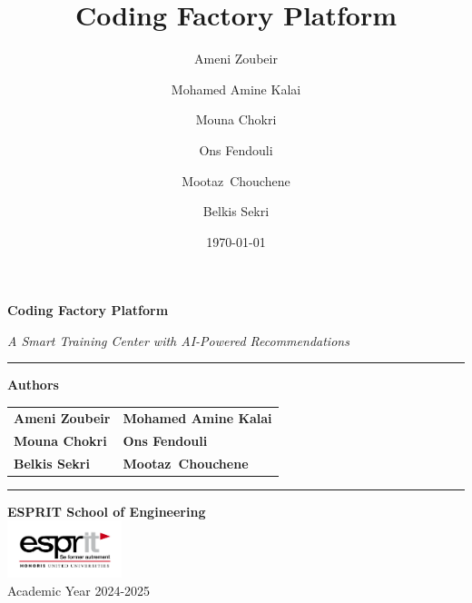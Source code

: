 \documentclass[12pt,a4paper]{report}
\title{Coding Factory Platform}
\author{Ameni Zoubeir \and Mohamed Amine Kalai \and Mouna Chokri \and Ons Fendouli \and {\mbox{Mootaz Chouchene}} \and Belkis Sekri}
\date{\today}
\begin{document}
\begin{titlepage}
\thispagestyle{empty} %

\begin{center}
\vspace*{2cm} %

{\color{black}\fontsize{28}{34}\selectfont\bfseries Coding Factory Platform}

\vspace{0.8cm}
{\large\itshape A Smart Training Center with AI-Powered Recommendations}

\vspace{2cm}

\rule{0.7\textwidth}{1pt}

\vspace{2cm}

{\large\bfseries Authors}\\[0.3cm]
\begin{tabular}{p{3.5cm}p{3.5cm}}
\textbf{Ameni Zoubeir} & \textbf{Mohamed Amine Kalai} \\[0.2cm]
\textbf{Mouna Chokri} & \textbf{Ons Fendouli} \\[0.2cm]
\textbf{Belkis Sekri} & \textbf{\mbox{Mootaz Chouchene}}
\end{tabular}

\vspace{2cm}

\rule{0.5\textwidth}{1pt}

\vfill

{\large\bfseries ESPRIT School of Engineering}\\[0.5cm]
\includegraphics[width=0.25\textwidth]{media/esprit.png}\\[0.5cm]
{\normalsize Academic Year 2024-2025}\\[0.5cm]

\end{center}
\end{titlepage}

\newpage
\thispagestyle{empty}
\mbox{}
\newpage
\end{document}

